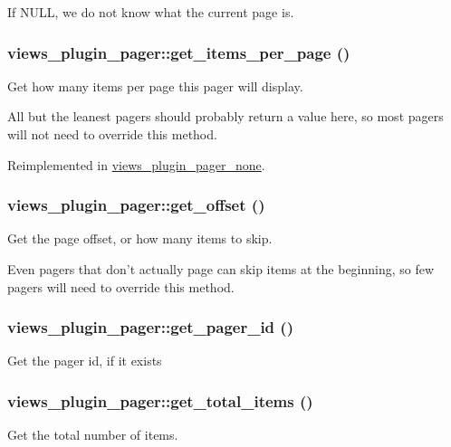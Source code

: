 If NULL, we do not know what the current page is. \hypertarget{classviews__plugin__pager_abdae5c9965b541f4b54fb7dae64bfc70}{
\subsubsection[{get\_\-items\_\-per\_\-page}]{\setlength{\rightskip}{0pt plus 5cm}views\_\-plugin\_\-pager::get\_\-items\_\-per\_\-page ()}}
\label{classviews__plugin__pager_abdae5c9965b541f4b54fb7dae64bfc70}
Get how many items per page this pager will display.

All but the leanest pagers should probably return a value here, so most pagers will not need to override this method. 

Reimplemented in \hyperlink{classviews__plugin__pager__none_adbd6fa6434d0708b1e7dd49ff4e9f1d0}{views\_\-plugin\_\-pager\_\-none}.\hypertarget{classviews__plugin__pager_a2feec47a258f0d70485456022591feaf}{
\subsubsection[{get\_\-offset}]{\setlength{\rightskip}{0pt plus 5cm}views\_\-plugin\_\-pager::get\_\-offset ()}}
\label{classviews__plugin__pager_a2feec47a258f0d70485456022591feaf}
Get the page offset, or how many items to skip.

Even pagers that don't actually page can skip items at the beginning, so few pagers will need to override this method. \hypertarget{classviews__plugin__pager_aa6291d10f42e3365c0e01efacf4df32f}{
\subsubsection[{get\_\-pager\_\-id}]{\setlength{\rightskip}{0pt plus 5cm}views\_\-plugin\_\-pager::get\_\-pager\_\-id ()}}
\label{classviews__plugin__pager_aa6291d10f42e3365c0e01efacf4df32f}
Get the pager id, if it exists \hypertarget{classviews__plugin__pager_a2dc88a3b98d258154d9289ccd1bd2078}{
\subsubsection[{get\_\-total\_\-items}]{\setlength{\rightskip}{0pt plus 5cm}views\_\-plugin\_\-pager::get\_\-total\_\-items ()}}
\label{classviews__plugin__pager_a2dc88a3b98d258154d9289ccd1bd2078}
Get the total number of items.

